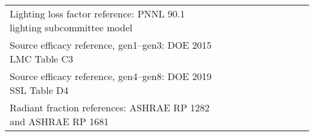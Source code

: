 \begin{center}
\begin{landscape}
\begin{longtable}{|p{0.75in}|p{0.65in}|p{0.47in}|p{0.4in}|p{0.45in}|p{0.4in}|p{0.4in}|p{0.4in}|p{0.4in}|p{0.4in}|p{0.4in}|p{0.4in}|p{0.4in}|p{0.4in}|}
  \multicolumn{5}{l}{Lighting loss factor reference: PNNL 90.1 lighting subcommittee model} \\
  \multicolumn{5}{l}{Source efficacy reference, gen1--gen3: DOE 2015 LMC Table C3} \\
  \multicolumn{5}{l}{Source efficacy reference, gen4--gen8: DOE 2019 SSL Table D4} \\
  \multicolumn{5}{l}{Radiant fraction references: ASHRAE RP 1282 and ASHRAE RP 1681} \\
  \end{longtable}
  \end{landscape}
  \end{center}
  